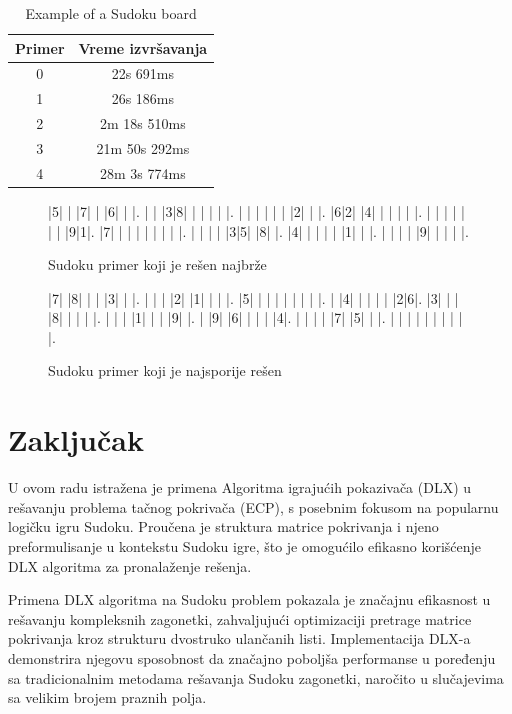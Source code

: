 \documentclass[a4paper]{article}
\begin{document}
{\begin{table}[h!]
\centering
\begin{tabular}{|c|c|}
  \hline
  Primer & Vreme izvršavanja\\ \hline
  0 & 22s 691ms \\ \hline
  1 & 26s 186ms \\ \hline
  2 & 2m 18s 510ms \\ \hline
  3 & 21m 50s 292ms \\ \hline
  4 & 28m 3s 774ms \\ \hline
  \end{tabular}
  \caption{Example of a Sudoku board}
\label{tab:result}
\end{table}

\begin{figure}[h!]
\begin{sudoku}
|5| | |7| | |6| | |.
| | |3|8| | | | | |.
| | | | | | |2| | |.
|6|2| |4| | | | | |.
| | | | | | | |9|1|.
|7| | | | | | | | |.
| | | | |3|5| |8| |.
|4| | | | | |1| | |.
| | | | |9| | | | |.
\end{sudoku}
\caption{Sudoku primer koji je rešen najbrže}
\label{fig:sudoku_easy}
\end{figure}

\begin{figure}[h!]
\begin{sudoku}
|7| |8| | | |3| | |.
| | | |2| |1| | | |.
|5| | | | | | | | |.
| |4| | | | | |2|6|.
|3| | | |8| | | | |.
| | | |1| | | |9| |.
| |9| |6| | | | |4|.
| | | | |7| |5| | |.
| | | | | | | | | |.
\end{sudoku}
\caption{Sudoku primer koji je najsporije rešen}
\label{fig:sudoku_hard}
\end{figure}
    


\section{Zaključak}
\label{sec:zakljucak}

U ovom radu istražena je primena Algoritma igrajućih pokazivača (DLX) u rešavanju problema tačnog pokrivača (ECP), s posebnim fokusom
na popularnu logičku igru Sudoku. Proučena je struktura matrice pokrivanja i njeno preformulisanje u kontekstu Sudoku igre, što je
omogućilo efikasno korišćenje DLX algoritma za pronalaženje rešenja.

Primena DLX algoritma na Sudoku problem pokazala je značajnu efikasnost u rešavanju kompleksnih zagonetki, zahvaljujući optimizaciji
pretrage matrice pokrivanja kroz strukturu dvostruko ulančanih listi. Implementacija DLX-a demonstrira njegovu sposobnost da značajno
poboljša performanse u poređenju sa tradicionalnim metodama rešavanja Sudoku zagonetki, naročito u slučajevima sa velikim brojem praznih
polja.

}
\end{document}
